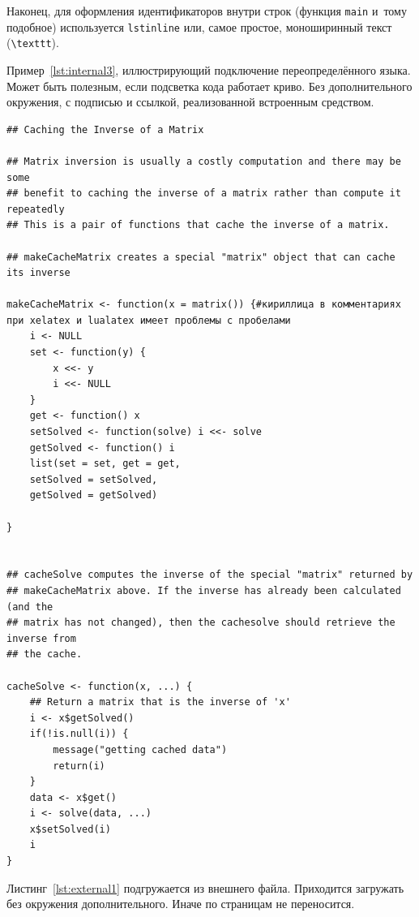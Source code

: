 Наконец, для оформления идентификаторов внутри строк
(функция \lstinline{main} и~тому подобное) используется
\texttt{lstinline} или, самое простое, моноширинный текст
(\texttt{\textbackslash texttt}).

Пример~\cref{lst:internal3}, иллюстрирующий подключение переопределённого
языка. Может быть полезным, если подсветка кода работает криво. Без
дополнительного окружения, с подписью и ссылкой, реализованной встроенным
средством.
\begingroup
\captiondelim{ } %
\begin{lstlisting}[language={Renhanced},caption={Пример листинга c подписью собственными средствами},label={lst:internal3}]
## Caching the Inverse of a Matrix

## Matrix inversion is usually a costly computation and there may be some
## benefit to caching the inverse of a matrix rather than compute it repeatedly
## This is a pair of functions that cache the inverse of a matrix.

## makeCacheMatrix creates a special "matrix" object that can cache its inverse

makeCacheMatrix <- function(x = matrix()) {#кириллица в комментариях при xelatex и lualatex имеет проблемы с пробелами
    i <- NULL
    set <- function(y) {
        x <<- y
        i <<- NULL
    }
    get <- function() x
    setSolved <- function(solve) i <<- solve
    getSolved <- function() i
    list(set = set, get = get,
    setSolved = setSolved,
    getSolved = getSolved)

}


## cacheSolve computes the inverse of the special "matrix" returned by
## makeCacheMatrix above. If the inverse has already been calculated (and the
## matrix has not changed), then the cachesolve should retrieve the inverse from
## the cache.

cacheSolve <- function(x, ...) {
    ## Return a matrix that is the inverse of 'x'
    i <- x$getSolved()
    if(!is.null(i)) {
        message("getting cached data")
        return(i)
    }
    data <- x$get()
    i <- solve(data, ...)
    x$setSolved(i)
    i
}
\end{lstlisting} %
\endgroup

Листинг~\cref{lst:external1} подгружается из внешнего файла. Приходится
загружать без окружения дополнительного. Иначе по страницам не переносится.
\begingroup
\captiondelim{ } %

\endgroup

